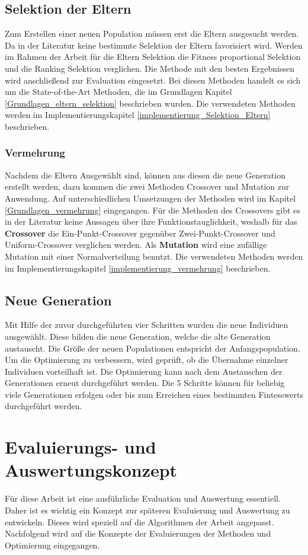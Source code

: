 \subsection{Selektion der Eltern}
Zum Erstellen einer neuen Population müssen erst die Eltern ausgesucht werden. Da in der Literatur keine bestimmte Selektion der Eltern favorisiert wird. Werden im Rahmen der Arbeit für die Eltern Selektion die Fitness proportional Selektion und die Ranking Selektion verglichen. Die Methode mit den besten Ergebnissen wird anschließend zur Evaluation eingesetzt. Bei diesen Methoden handelt es sich um die State-of-the-Art Methoden, die im Grundlagen Kapitel \ref{Grundlagen_eltern_selektion} beschrieben wurden. Die verwendeten Methoden werden im Implementierungskapitel \ref{implementierung_Selektion_Eltern} beschrieben.

\subsubsection{Vermehrung}
Nachdem die Eltern Ausgewählt sind, können aus diesen die neue Generation erstellt werden, dazu kommen die zwei Methoden Crossover und Mutation zur Anwendung. Auf unterschiedlichen Umsetzungen der Methoden wird im Kapitel \ref{Grundlagen_vermehrung} eingegangen. Für die Methoden des Crossovers gibt es in der Literatur keine Aussagen über ihre Funktionstauglichkeit, weshalb für das \textbf{Crossover} die Ein-Punkt-Crossover gegenüber Zwei-Punkt-Crossover und Uniform-Crossover verglichen werden. Als \textbf{Mutation} wird eine zufällige Mutation mit einer Normalverteilung benutzt. Die verwendeten Methoden werden im Implementierungskapitel \ref{implementierung_vermehrung} beschrieben.

\subsection{Neue Generation}
Mit Hilfe der zuvor durchgeführten vier Schritten wurden die neue Individuen ausgewählt. Diese bilden die neue Generation, welche die alte Generation austauscht. Die Größe der neuen Populationen entspricht der Anfangspopulation. Um die Optimierung zu verbessern, wird geprüft, ob die Übernahme einzelner Individuen vorteilhaft ist. Die Optimierung kann nach dem Austauschen der Generationen erneut durchgeführt werden. Die 5 Schritte können für beliebig viele Generationen erfolgen oder bis zum Erreichen eines bestimmten Fintesswerts durchgeführt werden. 


\section{Evaluierungs- und Auswertungskonzept}
Für diese Arbeit ist eine ausführliche Evaluation und Auswertung essentiell. Daher ist es wichtig ein Konzept zur späteren Evaluierung und Auswertung zu entwickeln. Dieses wird speziell auf die Algorithmen der Arbeit angepasst. Nachfolgend wird auf die Konzepte der Evaluierungen der Methoden und Optimierung eingegangen.

